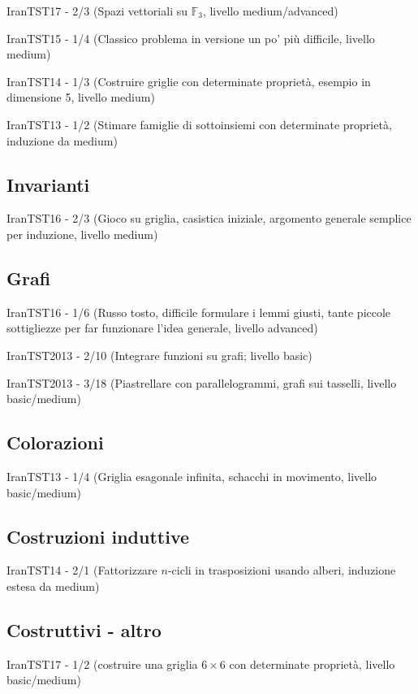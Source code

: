 \documentclass[a4paper,10pt]{article}
\newcommand{\Pro}[3]{#1#2 - #3}
\begin{document}
\Pro{IranTST}{17}{2/3} (Spazi vettoriali su $\mathbb{F}_3$, livello medium/advanced)

\Pro{IranTST}{15}{1/4} (Classico problema in versione un po' più difficile, livello medium)

\Pro{IranTST}{14}{1/3} (Costruire griglie con determinate proprietà, esempio in dimensione 5, livello medium)

\Pro{IranTST}{13}{1/2} (Stimare famiglie di sottoinsiemi con determinate proprietà, induzione da medium)

\subsection{Invarianti}

\Pro{IranTST}{16}{2/3} (Gioco su griglia, casistica iniziale, argomento generale semplice per induzione, livello medium)

\subsection{Grafi}
\Pro{IranTST}{16}{1/6} (Russo tosto, difficile formulare i lemmi giusti, tante piccole sottigliezze per far funzionare
l'idea generale, livello advanced)

\Pro{IranTST}{2013}{2/10} (Integrare funzioni su grafi; livello basic)

\Pro{IranTST}{2013}{3/18} (Piastrellare con parallelogrammi, grafi sui tasselli, livello basic/medium)

\subsection{Colorazioni}

\Pro{IranTST}{13}{1/4} (Griglia esagonale infinita, schacchi in movimento, livello basic/medium)

\subsection{Costruzioni induttive}

\Pro{IranTST}{14}{2/1} (Fattorizzare $n$-cicli in trasposizioni usando alberi, induzione estesa da medium)

\subsection{Costruttivi - altro}

\Pro{IranTST}{17}{1/2} (costruire una griglia $6\times 6$ con determinate proprietà, livello basic/medium)
\end{document}
